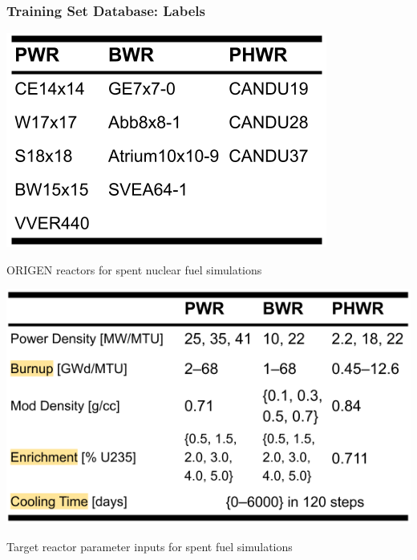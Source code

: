 
\begin{frame}
  \frametitle{Training Set Database: Labels}
  \begin{minipage}{0.43\textwidth}
    \begin{table}
      \centering
      \includegraphics[width=\textwidth]{./figures/trainset4_Orxtrs.png}
      \caption{ORIGEN reactors for spent nuclear fuel simulations}
    \end{table}
  \end{minipage}%
  \hfill
  \begin{minipage}{0.53\textwidth}
    \begin{table}
      \centering
      \includegraphics[width=\textwidth]{./figures/trainset4_inputs.png}
      \caption{Target reactor parameter inputs for spent fuel simulations}
    \end{table}
  \end{minipage}
\end{frame}

